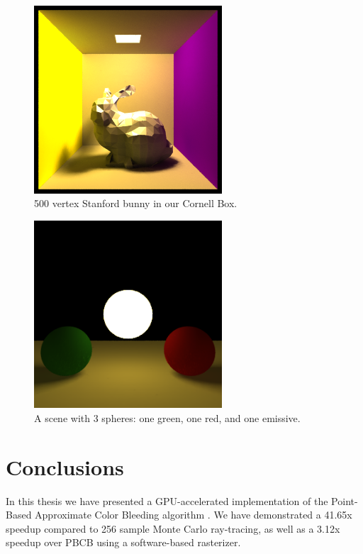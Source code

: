 \begin{figure}[H]
    \centering
    \includegraphics[width=70mm]{../img/bunny_small_tris.png}
    \caption[Bunny in Cornell Box]{500 vertex Stanford bunny \cite{bib:bunny} in our Cornell Box.}
    \label{fig:bunny}
\end{figure}

\begin{figure}[H]
    \centering
    \includegraphics[width=70mm]{../img/3spheres_rg.png}
    \caption[3 Spheres]{A scene with 3 spheres: one green, one red, and one emissive.}
    \label{fig:spheres}
\end{figure}

\section{Conclusions}
In this thesis we have presented a GPU-accelerated implementation of the Point-Based Approximate Color Bleeding algorithm \cite{bib:christensen2008}. We have demonstrated a 41.65x speedup compared to 256 sample Monte Carlo ray-tracing, as well as a 3.12x speedup over PBCB using a software-based rasterizer.

